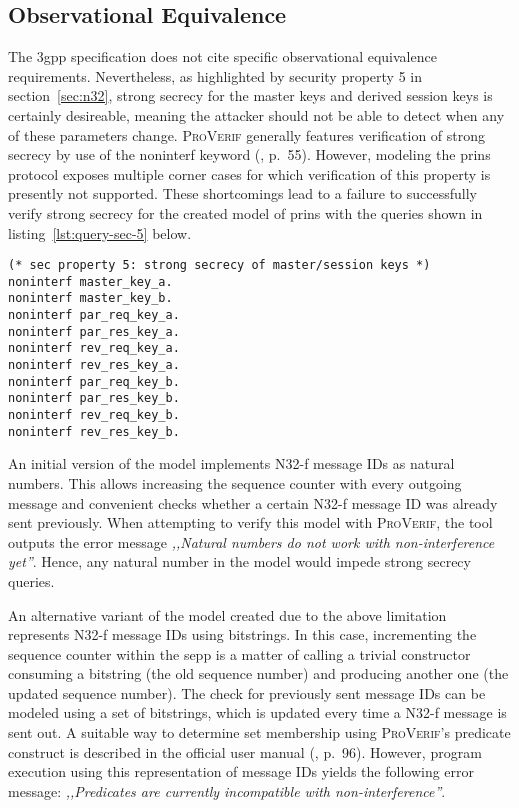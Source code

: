 \subsection{Observational Equivalence}
\label{ssec:equivalence}

The \gls{3gpp} specification does not cite specific observational equivalence requirements.
Nevertheless, as highlighted by security property 5 in section~\ref{sec:n32}, strong secrecy for the master keys and derived session keys is certainly desireable, meaning the attacker should not be able to detect when any of these parameters change.
\textsc{ProVerif} generally features verification of strong secrecy by use of the {\sffamily noninterf} keyword (\cite{blanchet2020proverif}, p.~55).
However, modeling the \gls{prins} protocol exposes multiple corner cases for which verification of this property is presently not supported.
These shortcomings lead to a failure to successfully verify strong secrecy for the created model of \gls{prins} with the queries shown in listing~\ref{lst:query-sec-5} below.

\begin{lstlisting}[caption={Query for security property 5},label={lst:query-sec-5},firstnumber=432]
(* sec property 5: strong secrecy of master/session keys *)
noninterf master_key_a.
noninterf master_key_b.
noninterf par_req_key_a.
noninterf par_res_key_a.
noninterf rev_req_key_a.
noninterf rev_res_key_a.
noninterf par_req_key_b.
noninterf par_res_key_b.
noninterf rev_req_key_b.
noninterf rev_res_key_b.
\end{lstlisting}

An initial version of the model implements N32-f message IDs as natural numbers.
This allows increasing the sequence counter with every outgoing message and convenient checks whether a certain N32-f message ID was already sent previously.
When attempting to verify this model with \textsc{ProVerif}, the tool outputs the error message \textit{,,Natural numbers do not work with non-interference yet''}.
Hence, any natural number in the model would impede strong secrecy queries.

An alternative variant of the model created due to the above limitation represents \mbox{N32-f} message IDs using bitstrings.
In this case, incrementing the sequence counter within the \gls{sepp} is a matter of calling a trivial constructor consuming a bitstring (the old sequence number) and producing another one (the updated sequence number).
The check for previously sent message IDs can be modeled using a set of bitstrings, which is updated every time a N32-f message is sent out.
A suitable way to determine set membership using \textsc{ProVerif}'s {\sffamily predicate} construct is described in the official user manual (\cite{blanchet2020proverif}, p.~96).
However, program execution using this representation of message IDs yields the following error message: \textit{,,Predicates are currently incompatible with non-interference''}.

